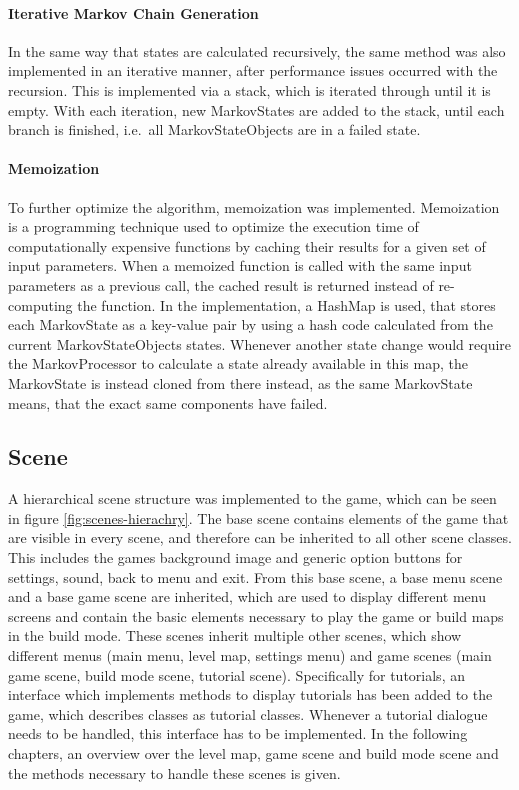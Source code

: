 \paragraph{Iterative Markov Chain Generation}
In the same way that states are calculated recursively, the same method was also implemented in an iterative manner,
after performance issues occurred with the recursion.
This is implemented via a stack, which is iterated through until it is empty.
With each iteration, new MarkovStates are added to the stack, until each branch is finished, i.e.\ all MarkovStateObjects are in a failed state.
\paragraph{Memoization}
To further optimize the algorithm, memoization was implemented.
Memoization is a programming technique used to optimize the execution time of computationally expensive functions by caching their results for a given set of input parameters.
When a memoized function is called with the same input parameters as a previous call, the cached result is returned instead of re-computing the function.
In the implementation, a HashMap is used, that stores each MarkovState as a key-value pair by using a hash code calculated from the current MarkovStateObjects states.
Whenever another state change would require the MarkovProcessor to calculate a state already available in this map, the MarkovState is instead cloned from there instead,
as the same MarkovState means, that the exact same components have failed.


\subsection{Scene}\label{subsec:scenes}
A hierarchical scene structure was implemented to the game, which can be seen in figure \ref{fig:scenes-hierachry}.
The base scene contains elements of the game that are visible in every scene, and therefore can be inherited to all other scene classes.
This includes the games background image and generic option buttons for settings, sound, back to menu and exit.
From this base scene, a base menu scene and a base game scene are inherited, which are used to display different menu screens and contain
the basic elements necessary to play the game or build maps in the build mode.
These scenes inherit multiple other scenes, which show different menus (main menu, level map, settings menu) and game scenes (main game scene, build mode scene, tutorial scene).
Specifically for tutorials, an interface which implements methods to display tutorials has been added to the game, which describes classes as tutorial classes.
Whenever a tutorial dialogue needs to be handled, this interface has to be implemented.
In the following chapters, an overview over the level map, game scene and build mode scene and the methods necessary to handle these scenes is given.

